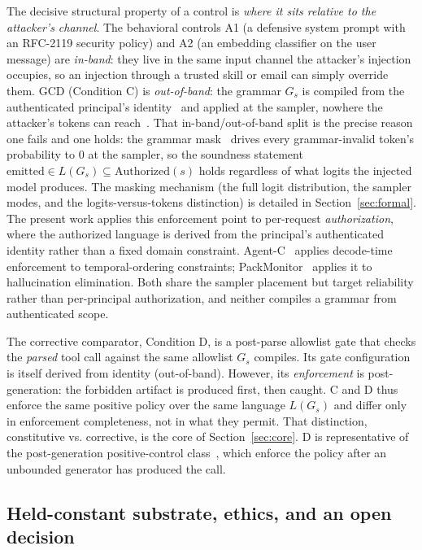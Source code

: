 The decisive structural property of a control is \emph{where it sits relative to the attacker's channel}. The behavioral controls A1 (a defensive system prompt with an RFC-2119 security policy) and A2 (an embedding classifier on the user message) are \emph{in-band}: they live in the same input channel the attacker's injection occupies, so an injection through a trusted skill or email can simply override them. GCD (Condition C) is \emph{out-of-band}: the grammar \(G_s\) is compiled from the authenticated principal's identity~\cite{sassaman2013langsec,anderson1972,saltzer1975} and applied at the sampler, nowhere the attacker's tokens can reach~\cite{anderson1972,saltzer1975}. That in-band/out-of-band split is the precise reason one fails and one holds: the grammar mask~\cite{willard2023,dong2024xgrammar} drives every grammar-invalid token's probability to \(0\) at the sampler, so the soundness statement \(\mathrm{emitted} \in L(G_s) \subseteq \mathrm{Authorized}(s)\) holds regardless of what logits the injected model produces. The masking mechanism (the full logit distribution, the sampler modes, and the logits-versus-tokens distinction) is detailed in Section~\ref{sec:formal}. The present work applies this enforcement point to per-request \emph{authorization}, where the authorized language is derived from the principal's authenticated identity rather than a fixed domain constraint. Agent-C~\cite{agentc2025} applies decode-time enforcement to temporal-ordering constraints; PackMonitor~\cite{packmonitor2026} applies it to hallucination elimination. Both share the sampler placement but target reliability rather than per-principal authorization, and neither compiles a grammar from authenticated scope.

The corrective comparator, Condition D, is a post-parse allowlist gate that checks the \emph{parsed} tool call against the same allowlist \(G_s\) compiles. Its gate configuration is itself derived from identity (out-of-band). However, its \emph{enforcement} is post-generation: the forbidden artifact is produced first, then caught. C and D thus enforce the same positive policy over the same language \(L(G_s)\) and differ only in enforcement completeness, not in what they permit. That distinction, constitutive vs. corrective, is the core of Section~\ref{sec:core}. D is representative of the post-generation positive-control class~\cite{camel2025,progent2025,oap2026,agentarmor2025,arm2026}, which enforce the policy after an unbounded generator has produced the call.

\subsection{Held-constant substrate, ethics, and an open decision}
\label{sec:threat-substrate}

